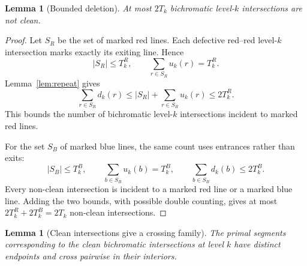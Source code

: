 \documentclass[12pt]{article}
\newtheorem{lemma}[theorem]{Lemma}
\begin{document}
\begin{lemma}[Bounded deletion]\label{lem:deletion}
At most \(2T_k\) bichromatic level-\(k\) intersections are not clean.
\end{lemma}

\begin{proof}
Let \(S_R\) be the set of marked red lines. Each defective red--red
level-\(k\) intersection marks exactly its exiting line. Hence
\[
 |S_R|\leq T_k^R,
 \qquad
 \sum_{r\in S_R}u_k(r)=T_k^R.
\]
Lemma~\ref{lem:repeat} gives
\[
 \sum_{r\in S_R}d_k(r)
 \leq |S_R|+\sum_{r\in S_R}u_k(r)
 \leq2T_k^R.
\]
This bounds the number of bichromatic level-\(k\) intersections
incident to marked red lines.

For the set \(S_B\) of marked blue lines, the same count uses
entrances rather than exits:
\[
 |S_B|\leq T_k^B,
 \qquad
 \sum_{b\in S_B}u_k(b)=T_k^B,
 \qquad
 \sum_{b\in S_B}d_k(b)\leq2T_k^B.
\]
Every non-clean intersection is incident to a marked red line or
a marked blue line. Adding the two bounds, with possible double
counting, gives at most
\(2T_k^R+2T_k^B=2T_k\) non-clean intersections.
\end{proof}

\begin{lemma}[Clean intersections give a crossing family]
\label{lem:clean}
The primal segments corresponding to the clean bichromatic
intersections at level \(k\) have distinct endpoints and cross
pairwise in their interiors.
\end{lemma}
\end{document}

